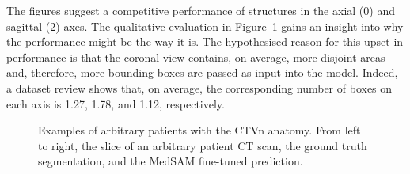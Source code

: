 \documentclass[11pt,twoside]{report}
\begin{document}
The figures suggest a competitive performance of structures in the axial (0) and sagittal (2) axes. The qualitative evaluation in Figure~\ref{fig:ctvn-medsam-prediction-all-three-axis} gains an insight into why the performance might be the way it is. The hypothesised reason for this upset in performance is that the coronal view contains, on average, more disjoint areas and, therefore, more bounding boxes are passed as input into the model. Indeed, a dataset review shows that, on average, the corresponding number of boxes on each axis is 1.27, 1.78, and 1.12, respectively. 

\begin{figure}[H]
  \centering
  \caption{Examples of arbitrary patients with the CTVn anatomy. From left to right, the slice of an arbitrary patient CT scan, the ground truth segmentation, and the MedSAM fine-tuned prediction.}\label{fig:ctvn-medsam-prediction-all-three-axis}
\end{figure}
\end{document}
